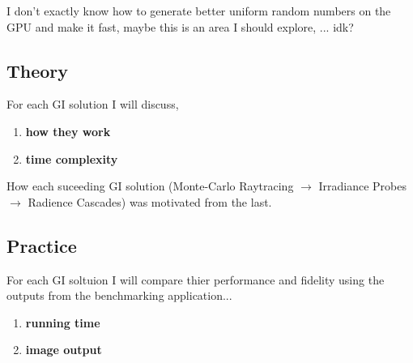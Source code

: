 \documentclass[sigconf, nonacm]{acmart}
\begin{document}
\newpage
I don't exactly know how to generate better uniform random numbers on the GPU and make it fast, maybe this is an area I should explore, ... idk?

\subsection*{Theory}
For each GI solution I will discuss,
\begin{enumerate}
    \item \textbf{how they work}
    \item \textbf{time complexity}
\end{enumerate}
How each suceeding GI solution (Monte-Carlo Raytracing $\rightarrow$ Irradiance Probes $\rightarrow$ Radience Cascades) was motivated from the last. 

\subsection*{Practice}
For each GI soltuion I will compare thier performance and fidelity using the outputs from the benchmarking application...
\begin{enumerate}
    \item \textbf{running time}
    \item \textbf{image output}
\end{enumerate}




% 
\end{document}
